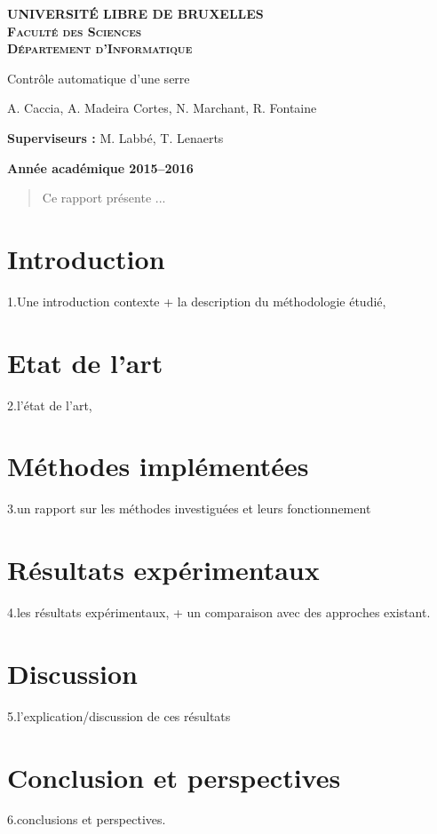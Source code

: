 \documentclass[a4paper,10pt]{report}
\begin{document}
\begin{titlepage}
\begin{center}
\textbf{\textsc{UNIVERSITÉ LIBRE DE BRUXELLES}}\\
\textbf{\textsc{Faculté des Sciences}}\\
\textbf{\textsc{Département d'Informatique}}
\vfill{}\vfill{}
\begin{center}{\Huge Contrôle automatique d'une serre}\end{center}{\Huge \par}
\begin{center}{\large A. Caccia, A. Madeira Cortes, N. Marchant, R. Fontaine}\end{center}{\Huge \par}
\vfill{}\vfill{}
\begin{flushleft}{\large \textbf{Superviseurs :} M. Labbé, T. Lenaerts}\hfill{}\end{flushleft}{\large\par}
\vfill{}\vfill{}\enlargethispage{3cm}
\textbf{Année académique 2015--2016}
\end{center}
\end{titlepage}

\begin{abstract}
Ce rapport présente ...
\end{abstract}


\tableofcontents


\chapter{Introduction}
1.Une introduction contexte + la description du méthodologie étudié,

\chapter{Etat de l'art}
2.l’état de l’art,

\chapter{Méthodes implémentées}
3.un rapport sur les méthodes investiguées et leurs fonctionnement

\chapter{Résultats expérimentaux}
4.les résultats expérimentaux, + un comparaison avec des approches existant.

\chapter{Discussion}
5.l’explication/discussion de ces résultats

\chapter{Conclusion et perspectives}
6.conclusions et perspectives.




\end{document}
